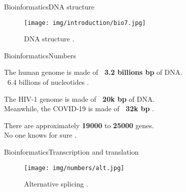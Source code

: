 \documentclass[10pt]{beamer}
\newcommand{\1}{
        	\setbeamertemplate{background}{
        		\texttt{[image: img/1]}
        		\tikz[overlay] \fill[fill opacity=0.75,fill=white] (0,0) rectangle (-\paperwidth,\paperheight);
        	}
}
\begin{document}
\begin{frame}{Bioinformatics}{DNA structure}
	\begin{figure}[]
		\centering
		\texttt{[image: img/introduction/bio7.jpg]}
		\label{img:mot2}
		\caption{DNA structure \cite{dnastructure2020}.}
	\end{figure}
\end{frame}



\begin{frame}{Bioinformatics}{Numbers}
	
	\begin{block}{}
		\centering
		The human genome is made of \textbf{\string ~3.2 billions bp} of DNA. \\
		\string ~6.4 billions of nucleotides \cite{archibald2018genomics}.
	\end{block}

	\pause
	\begin{block}{}
		\centering
		The HIV-1 genome is made of \textbf{\string ~20k bp} of DNA. \\
		Meanwhile, the COVID-19 is made of \textbf{\string ~32k bp} \cite{randhawa2020machine}.
	\end{block}

	\pause
	\begin{block}{}
		\centering
		There are approximately \textbf{19000} to \textbf{25000} genes. \\
		No one knows for sure \cite{archibald2018genomics}.
	\end{block}
	
\end{frame}

\begin{frame}{Bioinformatics}{Transcription and translation}
	\begin{figure}[]
		\centering
		\texttt{[image: img/numbers/alt.jpg]}
		\label{img:mot2}
		\caption{Alternative splicing \cite{genbio2020}.}
	\end{figure}
\end{frame}
\end{document}

